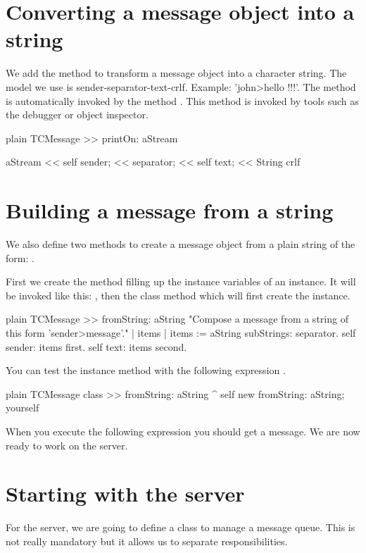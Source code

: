 \documentclass[10pt,twoside,english]{_support/latex/sbabook/sbabook}
\begin{document}
\section{Converting a message object into a string}
We add the method  to transform a message object into a character string.
The model we use is sender-separator-text-crlf. Example: 'john\textgreater{}hello !!!'.
The method  is automatically invoked by the method . This method is invoked by tools such
as the debugger or object inspector. 

\begin{displaycode}{plain}
TCMessage >> printOn: aStream

	aStream 
		<< self sender; << separator; 
		<< self text; << String crlf
\end{displaycode}
\section{Building a message from a string }
We also define two methods to create a message object from a plain string of the form: .

First we create the method  filling up the instance variables of an instance. It will be invoked like this: , then the class method  which will first create the instance.

\begin{displaycode}{plain}
TCMessage >> fromString: aString
	"Compose a message from a string of this form 'sender>message'."
	| items |
	items := aString subStrings: separator.
	self sender: items first.
	self text: items second.
\end{displaycode}

You can test the instance method with the following expression .

\begin{displaycode}{plain}
TCMessage class >> fromString: aString
	^ self new 
		fromString: aString;
		yourself
\end{displaycode}

When you execute the following expression  you should get a message.
We are now ready to work on the server.
\section{Starting with the server}
For the server, we are going to define a class to manage a message queue. This is not really mandatory but it allows
us to separate responsibilities. 
\end{document}
